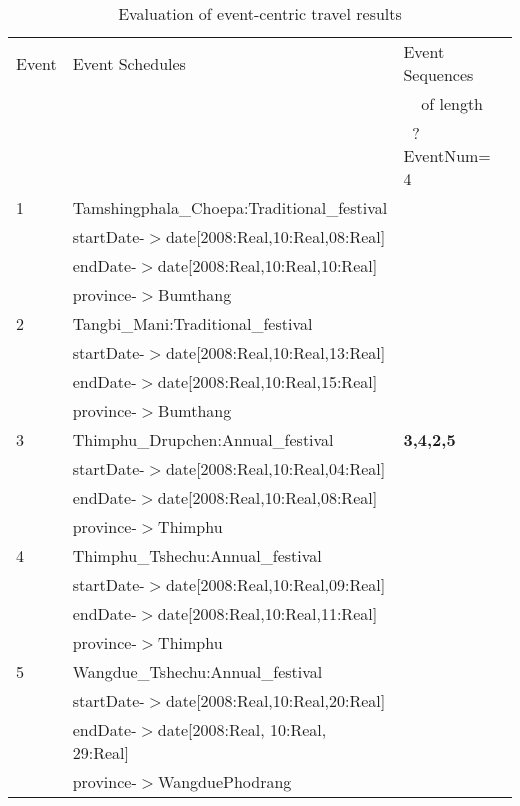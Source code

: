\begin{table} [tbph]
\caption{Evaluation of event-centric travel results}
\centering
\footnotesize
\begin{tabular}{|l|l|l|}
\hline
Event &Event Schedules &Event Sequences\\
 & & $~~~~~$of length\\
 & &$~$ ?EventNum= 4\\
\hline
  1  &Tamshingphala\_Choepa:Traditional\_festival&\\
     &startDate-$>$date[2008:Real,10:Real,08:Real]&\\
   &endDate-$>$date[2008:Real,10:Real,10:Real]&\\
   &province-$>$Bumthang&\\
\hline
  2  &Tangbi\_Mani:Traditional\_festival&\\
     &startDate-$>$date[2008:Real,10:Real,13:Real]&\\
   &endDate-$>$date[2008:Real,10:Real,15:Real]&\\
   &province-$>$Bumthang&\\
\hline
  3  &Thimphu\_Drupchen:Annual\_festival&\textbf{3,4,2,5}\\
     &startDate-$>$date[2008:Real,10:Real,04:Real]&\\
   &endDate-$>$date[2008:Real,10:Real,08:Real]&\\
   &province-$>$Thimphu&\\
\hline
 4  &Thimphu\_Tshechu:Annual\_festival&\\
     &startDate-$>$date[2008:Real,10:Real,09:Real]&\\
   &endDate-$>$date[2008:Real,10:Real,11:Real]&\\
   &province-$>$Thimphu&\\
\hline
 5  &Wangdue\_Tshechu:Annual\_festival&\\
     &startDate-$>$date[2008:Real,10:Real,20:Real]&\\
   &endDate-$>$date[2008:Real, 10:Real, 29:Real]&\\
   &province-$>$WangduePhodrang&\\
\hline
\end{tabular}
\end{table} 
\vspace{-0.5cm}

